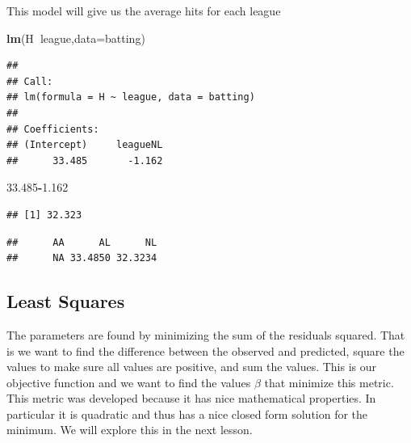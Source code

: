 \documentclass[]{book}
\newenvironment{Shaded}{\begin{snugshade}}{\end{snugshade}}
\newcommand{\KeywordTok}[1]{\textcolor[rgb]{0.13,0.29,0.53}{\textbf{#1}}}
\newcommand{\DataTypeTok}[1]{\textcolor[rgb]{0.13,0.29,0.53}{#1}}
\newcommand{\FloatTok}[1]{\textcolor[rgb]{0.00,0.00,0.81}{#1}}
\newcommand{\OperatorTok}[1]{\textcolor[rgb]{0.81,0.36,0.00}{\textbf{#1}}}
\newcommand{\NormalTok}[1]{#1}
\theoremstyle{definition}
\theoremstyle{definition}
\theoremstyle{definition}
\theoremstyle{remark}
\begin{document}
This model will give us the average hits for each league

\begin{Shaded}
\begin{Highlighting}[]
\KeywordTok{lm}\NormalTok{(H}\OperatorTok{~}\NormalTok{league,}\DataTypeTok{data=}\NormalTok{batting)}
\end{Highlighting}
\end{Shaded}

\begin{verbatim}
## 
## Call:
## lm(formula = H ~ league, data = batting)
## 
## Coefficients:
## (Intercept)     leagueNL  
##      33.485       -1.162
\end{verbatim}

\begin{Shaded}
\begin{Highlighting}[]
\FloatTok{33.485}\OperatorTok{-}\FloatTok{1.162}
\end{Highlighting}
\end{Shaded}

\begin{verbatim}
## [1] 32.323
\end{verbatim}

\begin{Shaded}
\end{Shaded}

\begin{verbatim}
##      AA      AL      NL 
##      NA 33.4850 32.3234
\end{verbatim}

\subsection{Least Squares}\label{least-squares}

The parameters are found by minimizing the sum of the residuals squared.
That is we want to find the difference between the observed and
predicted, square the values to make sure all values are positive, and
sum the values. This is our objective function and we want to find the
values \(\beta\) that minimize this metric. This metric was developed
because it has nice mathematical properties. In particular it is
quadratic and thus has a nice closed form solution for the minimum. We
will explore this in the next lesson.
\end{document}
